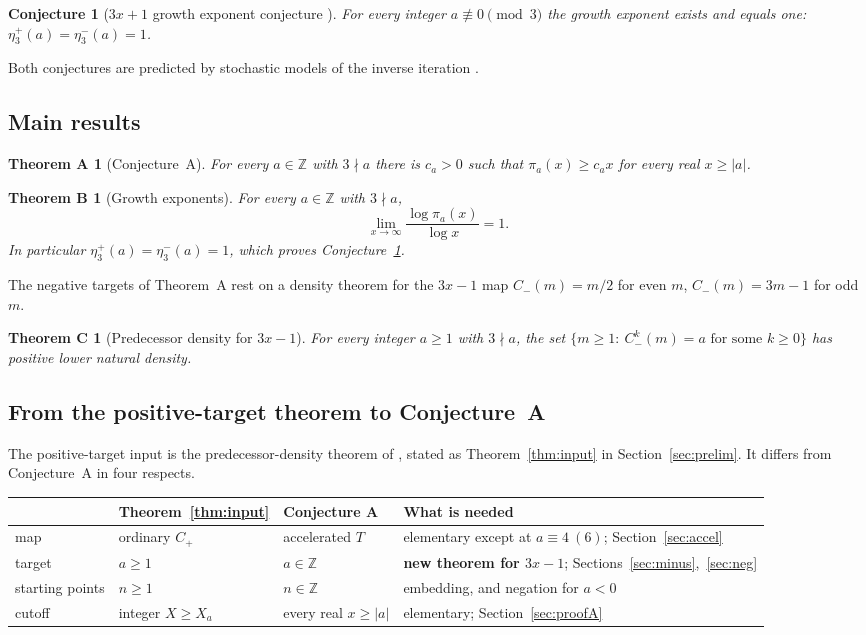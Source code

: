 \documentclass[11pt]{amsart}
\newtheorem{conjecture}[theorem]{Conjecture}
\newtheorem*{theoremA}{Theorem A}
\newtheorem*{theoremB}{Theorem B}
\newtheorem*{theoremC}{Theorem C}
\theoremstyle{definition}
\theoremstyle{remark}
\newcommand{\Z}{\mathbb{Z}}
\newcommand{\Cp}{C_{+}}
\newcommand{\Cm}{C_{-}}
\begin{document}
\begin{conjecture}[$3x+1$ growth exponent conjecture {\cite[Conjecture~2.1]{KontorovichLagarias10}}]
\label{conj:growth}
For every integer $a\not\equiv0\pmod3$ the growth exponent exists and equals one:
$\eta_3^{+}(a)=\eta_3^{-}(a)=1$.
\end{conjecture}

Both conjectures are predicted by stochastic models of the inverse iteration
\cite{KontorovichLagarias10}.

\subsection{Main results}

\begin{theoremA}[Conjecture~A]
For every $a\in\Z$ with $3\nmid a$ there is $c_a>0$ such that $\pi_a(x)\ge c_a x$ for every real
$x\ge|a|$.
\end{theoremA}

\begin{theoremB}[Growth exponents]
For every $a\in\Z$ with $3\nmid a$,
\[
  \lim_{x\to\infty}\frac{\log\pi_a(x)}{\log x}=1 .
\]
In particular $\eta_3^{+}(a)=\eta_3^{-}(a)=1$, which proves Conjecture~\ref{conj:growth}.
\end{theoremB}

The negative targets of Theorem~A rest on a density theorem for the $3x-1$ map
$\Cm(m)=m/2$ for even $m$, $\Cm(m)=3m-1$ for odd $m$.

\begin{theoremC}[Predecessor density for $3x-1$]
For every integer $a\ge1$ with $3\nmid a$, the set $\{m\ge1:\ \Cm^{k}(m)=a\text{ for some }k\ge0\}$
has positive lower natural density.
\end{theoremC}

\subsection{From the positive-target theorem to Conjecture~A}
The positive-target input is the predecessor-density theorem of \cite{MazurM2}, stated as
Theorem~\ref{thm:input} in Section~\ref{sec:prelim}. It differs from Conjecture~A in four respects.

\begin{center}
\small
\begin{tabular}{@{}llll@{}}
\toprule
 & Theorem~\ref{thm:input} & Conjecture A & What is needed \\
\midrule
map & ordinary $\Cp$ & accelerated $T$ & elementary except at $a\equiv4\ (6)$; Section~\ref{sec:accel} \\
target & $a\ge1$ & $a\in\Z$ & \textbf{new theorem for $3x-1$}; Sections~\ref{sec:minus},~\ref{sec:neg} \\
starting points & $n\ge1$ & $n\in\Z$ & embedding, and negation for $a<0$ \\
cutoff & integer $X\ge X_a$ & every real $x\ge|a|$ & elementary; Section~\ref{sec:proofA} \\
\bottomrule
\end{tabular}
\end{center}
\end{document}
